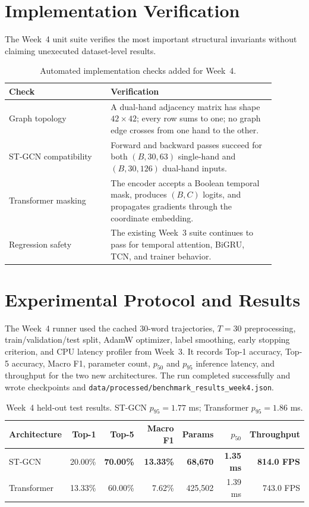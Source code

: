 \documentclass{article}
\begin{document}
\section*{Implementation Verification}
The Week~4 unit suite verifies the most important structural invariants without claiming unexecuted dataset-level results.
\begin{table}[h]
\centering
\small
\begin{tabular}{p{0.34\linewidth}p{0.55\linewidth}}
\toprule
\textbf{Check} & \textbf{Verification}\\
\midrule
Graph topology & A dual-hand adjacency matrix has shape $42\times42$; every row sums to one; no graph edge crosses from one hand to the other.\\
ST-GCN compatibility & Forward and backward passes succeed for both $(B,30,63)$ single-hand and $(B,30,126)$ dual-hand inputs.\\
Transformer masking & The encoder accepts a Boolean temporal mask, produces $(B,C)$ logits, and propagates gradients through the coordinate embedding.\\
Regression safety & The existing Week~3 suite continues to pass for temporal attention, BiGRU, TCN, and trainer behavior.\\
\bottomrule
\end{tabular}
\caption{Automated implementation checks added for Week~4.}
\end{table}

\section*{Experimental Protocol and Results}
The Week~4 runner used the cached 30-word trajectories, $T=30$ preprocessing, train/validation/test split, AdamW optimizer, label smoothing, early stopping criterion, and CPU latency profiler from Week~3. It records Top-1 accuracy, Top-5 accuracy, Macro F1, parameter count, $p_{50}$ and $p_{95}$ inference latency, and throughput for the two new architectures. The run completed successfully and wrote checkpoints and \texttt{data/processed/benchmark\_results\_week4.json}.

\begin{table}[h]
\centering
\small
\begin{tabular}{lrrrrrr}
\toprule
\textbf{Architecture} & \textbf{Top-1} & \textbf{Top-5} & \textbf{Macro F1} & \textbf{Params} & \textbf{$p_{50}$} & \textbf{Throughput} \\
\midrule
ST-GCN & 20.00\% & \textbf{70.00\%} & \textbf{13.33\%} & \textbf{68,670} & \textbf{1.35 ms} & \textbf{814.0 FPS} \\
Transformer & 13.33\% & 60.00\% & 7.62\% & 425,502 & 1.39 ms & 743.0 FPS \\
\bottomrule
\end{tabular}
\caption{Week~4 held-out test results. ST-GCN $p_{95}=1.77$ ms; Transformer $p_{95}=1.86$ ms.}
\label{tab:week4-results}
\end{table}
\end{document}

